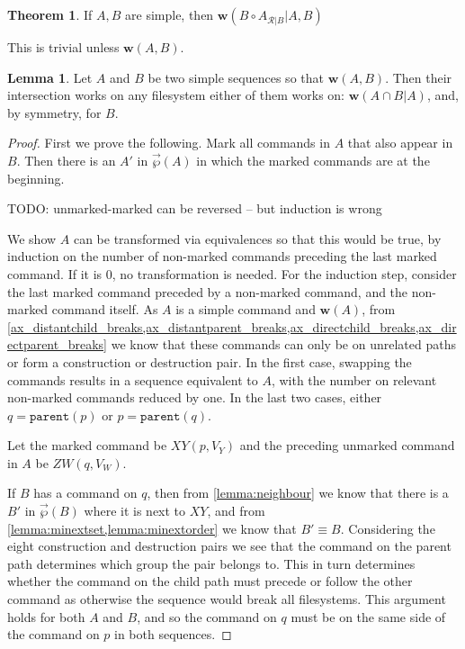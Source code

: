 \documentclass[12pt]{article}
\newcommand{\parent}{\mathtt{parent}}
\newcommand{\fscommand}[2]{{#1#2}}
\newcommand{\cxy}{\fscommand{X}{Y}}
\newcommand{\czw}{\fscommand{Z}{W}}
\newcommand{\cc}{\circ} %
\newcommand{\works}[1]{{\mathbf{w}}({#1})}
\newcommand{\worksc}[2]{{\mathbf{w}}({#1}|{#2})}
\newcommand{\orderset}[1]{\vec{\wp}({#1})}
\newcommand{\ordered}[1]{#1}
\newcommand{\recchar}[3]{{#1}^{#3}_{\mathcal{R}|{#2}}}
\newcommand{\reca}{\recchar{A}{B}{}} %
\theoremstyle{definition}
\newtheorem{mylem}{Lemma}
\newtheorem{myth}{Theorem}
\begin{document}
\begin{myth}
If $A, B$ are simple, then $\worksc{B\cc \reca}{A,B}$
\end{myth}

This is trivial unless $\works{A,B}$.

\begin{mylem}
Let $A$ and $B$ be two simple sequences so that $\works{A, B}$.
Then their intersection works on any filesystem
either of them works on:
$\worksc{\ordered{A\cap B}}{A}$, and, by symmetry, for $B$.
\end{mylem}

\begin{proof}
First we prove the following.
Mark all commands in $A$ that also appear in $B$.
Then there is an $A'$ in $\orderset{A}$ in which the marked commands are at the beginning.

\medskip

TODO: unmarked-marked can be reversed -- but induction is wrong

We show $A$ can be transformed via equivalences so that this would be true,
by induction on the number of non-marked commands preceding the last marked command.
If it is 0, no transformation is needed.
For the induction step, consider the last marked command preceded by a non-marked command,
and the non-marked command itself.
As $A$ is a simple command and $\works{A}$, from 
\cref{ax_distantchild_breaks,ax_distantparent_breaks,ax_directchild_breaks,ax_directparent_breaks}
we know that these commands can only be on unrelated paths or form a construction or destruction pair.
In the first case, swapping the commands results in a sequence equivalent to $A$,
with the number on relevant non-marked commands reduced by one.
In the last two cases,
either $q=\parent(p)$ or $p=\parent(q)$.

Let the marked command be $\cxy(p, V_Y)$ and the preceding unmarked command in $A$ be $\czw(q, V_W)$.

If $B$ has a command on $q$, then
from \cref{lemma:neighbour}
we know that there is a $B'$ in $\orderset{B}$ where it is next to $\cxy$,
and from \cref{lemma:minextset,lemma:minextorder} we know that $B'\equiv B$.
Considering the eight construction and destruction pairs we see that the command
on the parent path determines which group the pair belongs to.
This in turn determines whether the command on the child path must
precede or follow the other command as otherwise the sequence would break all filesystems.
This argument holds for both $A$ and $B$, and so the command on $q$ must be on
the same side of the command on $p$ in both sequences.


\end{proof}
\end{document}
